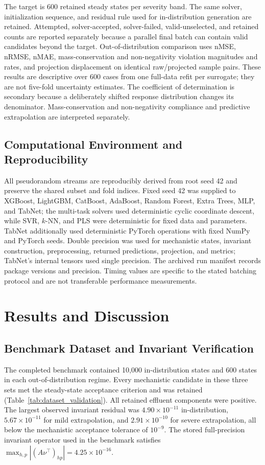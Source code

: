 \documentclass[a4paper,fleqn]{cas-sc}
\begin{document}
The target is 600 retained steady states per severity band. The same solver, initialization sequence, and residual rule used for in-distribution generation are retained. Attempted, solver-accepted, solver-failed, valid-unselected, and retained counts are reported separately because a parallel final batch can contain valid candidates beyond the target. Out-of-distribution comparison uses nMSE, nRMSE, nMAE, mass-conservation and non-negativity violation magnitudes and rates, and projection displacement on identical raw/projected sample pairs. These results are descriptive over 600 cases from one full-data refit per surrogate; they are not five-fold uncertainty estimates. The coefficient of determination is secondary because a deliberately shifted response distribution changes its denominator. Mass-conservation and non-negativity compliance and predictive extrapolation are interpreted separately.

\subsection{Computational Environment and Reproducibility}

All pseudorandom streams are reproducibly derived from root seed 42 and preserve the shared subset and fold indices. Fixed seed 42 was supplied to XGBoost, LightGBM, CatBoost, AdaBoost, Random Forest, Extra Trees, MLP, and TabNet; the multi-task solvers used deterministic cyclic coordinate descent, while SVR, $k$-NN, and PLS were deterministic for fixed data and parameters. TabNet additionally used deterministic PyTorch operations with fixed NumPy and PyTorch seeds. Double precision was used for mechanistic states, invariant construction, preprocessing, returned predictions, projection, and metrics; TabNet's internal tensors used single precision. The archived run manifest records package versions and precision. Timing values are specific to the stated batching protocol and are not transferable performance measurements.

\section{Results and Discussion}

\subsection{Benchmark Dataset and Invariant Verification}

The completed benchmark contained 10,000 in-distribution states and 600 states in each out-of-distribution regime. Every mechanistic candidate in these three sets met the steady-state acceptance criterion and was retained (Table~\ref{tab:dataset_validation}). All retained effluent components were positive. The largest observed invariant residual was $4.90\times10^{-11}$ in-distribution, $5.67\times10^{-11}$ for mild extrapolation, and $2.91\times10^{-10}$ for severe extrapolation, all below the mechanistic acceptance tolerance of $10^{-9}$. The stored full-precision invariant operator used in the benchmark satisfies $\max_{h,p}|(A\nu^\top)_{hp}|=4.25\times10^{-16}$.
\end{document}
